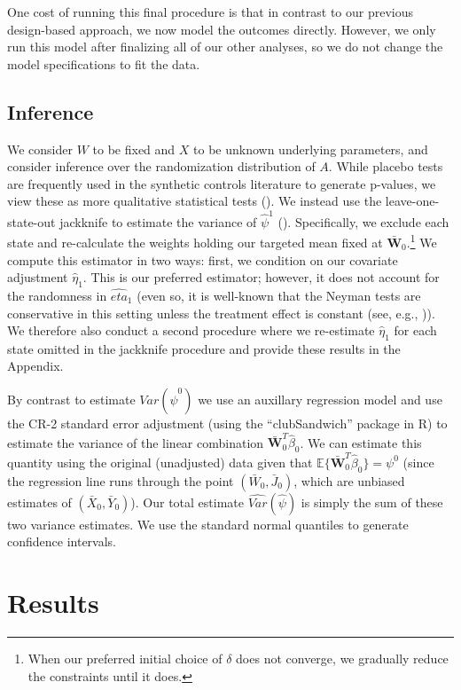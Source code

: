 \documentclass[aoas]{imsart}
\theoremstyle{plain}
\newcommand{\matr}[1]{\mathbf{#1}} %
\theoremstyle{remark}
\begin{document}
One cost of running this final procedure is that in contrast to our previous design-based approach, we now model the outcomes directly. However, we only run this model after finalizing all of our other analyses, so we do not change the model specifications to fit the data.

\subsection{Inference}

We consider $W$ to be fixed and $X$ to be unknown underlying parameters, and consider inference over the randomization distribution of $A$. While placebo tests are frequently used in the synthetic controls literature to generate p-values, we view these as more qualitative statistical tests (\cite{arkhangelsky2019synthetic}). We instead use the leave-one-state-out jackknife to estimate the variance of $\hat{\psi}^1$ (\cite{cameron2015practitioner}). Specifically, we exclude each state and re-calculate the weights holding our targeted mean fixed at $\bar{\matr{W}}_0$.\footnote{When our preferred initial choice of $\delta$ does not converge, we gradually reduce the constraints until it does.} We compute this estimator in two ways: first, we condition on our covariate adjustment $\hat{\eta}_1$. This is our preferred estimator; however, it does not account for the randomness in $\hat{eta}_1$ (even so, it is well-known that the Neyman tests are conservative in this setting unless the treatment effect is constant (see, e.g., \cite{imbens2015causal})). We therefore also conduct a second procedure where we re-estimate $\hat{\eta}_1$ for each state omitted in the jackknife procedure and provide these results in the Appendix.

By contrast to estimate $Var(\hat{\psi}^0)$ we use an auxillary regression model and use the CR-2 standard error adjustment (using the ``clubSandwich'' package in R) to estimate the variance of the linear combination $\bar{\matr{W}}_0^T\hat{\beta}_0$. We can estimate this quantity using the original (unadjusted) data given that $\mathbb{E}\{\bar{\matr{W}}_0^T\hat{\beta}_0\} = \psi^0$ (since the regression line runs through the point $(\bar{W}_0, \bar{J}_0)$, which are unbiased estimates of $(\bar{X}_0, \bar{Y}_0)$). Our total estimate $\hat{Var}(\hat{\psi})$ is simply the sum of these two variance estimates. We use the standard normal quantiles to generate confidence intervals. 

\section{Results}
\end{document}
